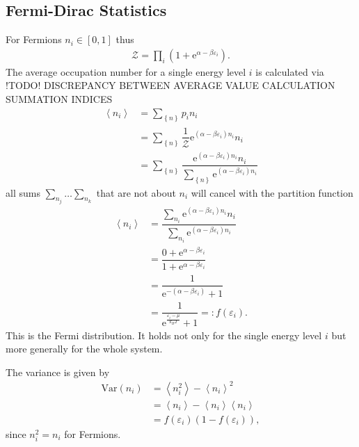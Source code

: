 \documentclass[a4paper,10pt]{article}
\numberwithin{equation}{section}
\begin{document}
\begin{multicols}{2}
\subsection{Fermi-Dirac Statistics}
For Fermions $n_i  \in \left[0,1\right]$ thus
\begin{align} 
  \mathcal{Z}=\prod_{i}^{}\left(1+\text{e}^{\alpha -\beta \varepsilon _i}\right)
.\end{align} 
The average occupation number for a single energy level $i$ is calculated via !TODO! DISCREPANCY BETWEEN AVERAGE VALUE CALCULATION SUMMATION INDICES
\begin{align} 
  \left\langle n_i\right\rangle  &= \sum_{ \left\{n\right\}}^{}p_i n_i\\
                                 &= \sum_{ \left\{n\right\}}^{}\dfrac{1}{\mathcal{Z}}\text{e}^{(\alpha -\beta \varepsilon _i)n_i}n_i\\
                                 &= \sum_{ \left\{n\right\}}^{}\dfrac{\text{e}^{(\alpha -\beta \varepsilon _i)n_i}n_i}{\sum_{ \left\{n\right\}}^{}\text{e}^{(\alpha -\beta \varepsilon _i)n_i}}
\end{align} 
all sums $\sum_{n_j}^{}\hdots \sum_{n_k}^{}$ that are not about $n_i$ will cancel with the partition function
\begin{align} 
  \left\langle n_i\right\rangle  &= \dfrac{\sum_{n_i}^{}\text{e}^{(\alpha -\beta \varepsilon _i)n_i}n_i}{\sum_{n_i}^{}\text{e}^{(\alpha -\beta \varepsilon _i)n_i}}\\
                                 &= \dfrac{0+\text{e}^{\alpha -\beta \varepsilon _i}}{1+\text{e}^{\alpha -\beta \varepsilon _i}}\\
                                 &= \dfrac{1}{\text{e}^{-(\alpha -\beta \varepsilon _i)}+1}\\
                                 &= \boxed{\dfrac{1}{\text{e}^{\tfrac{\varepsilon _i-\mu }{k_BT}}+1} =: f(\varepsilon _i)}
.\end{align} 
This is the Fermi distribution.
It holds not only for the single energy level $i$ but more generally for the whole system.

The variance is given by
\begin{align} 
  \text{Var}(n_i) &= \left\langle n_i^2\right\rangle -\left\langle n_i\right\rangle ^2\\
                  &= \left\langle n_i\right\rangle -\left\langle n_i\right\rangle \left\langle n_i\right\rangle \\
                  &= f(\varepsilon _i)(1-f(\varepsilon _i))
,\end{align} 
since $n_i^2=n_i$ for Fermions.


\end{multicols}
\end{document}

